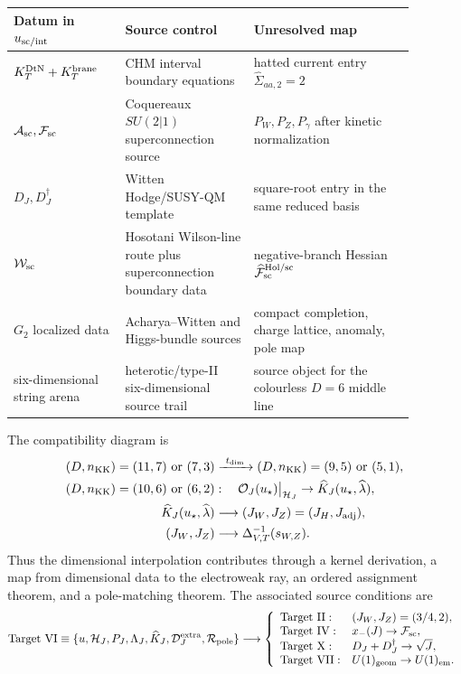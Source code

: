 \begin{center}
\begin{tabular}{p{0.24\linewidth}p{0.29\linewidth}p{0.35\linewidth}}
\toprule
Datum in \(u_{\rm sc/int}\) & Source control & Unresolved map \\
\midrule
\(K_T^{\rm DtN}+K_T^{\rm brane}\) & CHM interval boundary equations & hatted current entry \(\widehat\Sigma_{aa,2}=2\) \\
\(\mathcal A_{\rm sc},\mathcal F_{\rm sc}\) & Coquereaux \(SU(2|1)\) superconnection source & \(P_W,P_Z,P_\gamma\) after kinetic normalization \\
\(D_J,D_J^\dagger\) & Witten Hodge/SUSY-QM template & square-root entry in the same reduced basis \\
\(\mathcal W_{\rm sc}\) & Hosotani Wilson-line route plus superconnection boundary data & negative-branch Hessian \(\widehat{\mathcal F}_{\rm sc}^{\rm Hol/sc}\) \\
\(G_2\) localized data & Acharya--Witten and Higgs-bundle sources & compact completion, charge lattice, anomaly, pole map \\
six-dimensional string arena & heterotic/type-II six-dimensional source trail & source object for the colourless \(D=6\) middle line \\
\bottomrule
\end{tabular}
\end{center}
The compatibility diagram is
\begin{equation}
\begin{aligned}
(D,n_{\rm KK})=(11,7)\ {\rm or}\ (7,3)
&\xrightarrow{\ t_{\rm dim}\ }
(D,n_{\rm KK})=(9,5)\ {\rm or}\ (5,1),
\\
(D,n_{\rm KK})=(10,6)\ {\rm or}\ (6,2)
&:\quad
\mathcal O_J(u_\star)\big|_{\mathcal H_J}\to
\widehat K_J(u_\star,\widehat\lambda),
\\
\widehat K_J(u_\star,\widehat\lambda)
&\longrightarrow
(J_W,J_Z)=(J_H,J_{\rm adj}),
\\
(J_W,J_Z)
&\longrightarrow
\Delta^{-1}_{V,T}(s_{W,Z}) .
\end{aligned}
\label{eq:dimensional-compatibility-diagram}
\end{equation}
Thus the dimensional interpolation contributes through a kernel derivation, a
map from dimensional data to the electroweak ray, an ordered assignment theorem,
and a pole-matching theorem.  The associated source conditions are
\begin{equation}
{\rm Target~VI}
\equiv
\{u,\mathcal H_J,P_J,\Lambda_J,\widehat K_J,
\mathcal D_J^{\rm extra},\mathcal R_{\rm pole}\}
\longrightarrow
\left\{
\begin{array}{ll}
{\rm Target~II}: & (J_W,J_Z)=(3/4,2),\\
{\rm Target~IV}: & x_-(J)\to\mathcal F_{\rm sc},\\
{\rm Target~X}: & D_J+D_J^\dagger\to\sqrt J,\\
{\rm Target~VII}: & U(1)_{\rm geom}\to U(1)_{\rm em}.
\end{array}
\right.
\label{eq:o10-closure-residual-diagram}
\end{equation}

